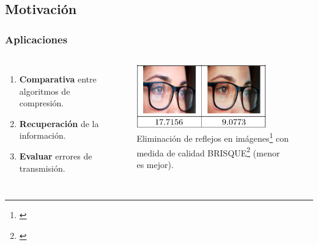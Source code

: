 \subsection{Motivación}
\begin{frame}
  \frametitle{Aplicaciones}
  \begin{columns}
  \begin{enumerate}
      \item\textbf{Comparativa} entre algoritmos de compresión.
      \item\textbf{Recuperación} de la información.
      \item\textbf{Evaluar} errores de transmisión.
  \end{enumerate}
  \begin{figure}
    \begin{center}
      \includegraphics[width=0.85\textwidth]{imagenes/chapter1/Brisque}
    \end{center}
    \caption{
      Eliminación de reflejos en imágenes\footnote[frame]{\cite{BRISQUEExample}}
      con medida de calidad BRISQUE\footnote[frame]{\cite{BRISQUE}} (menor es mejor).
  }
  \end{figure}
  \end{columns}
\end{frame}

